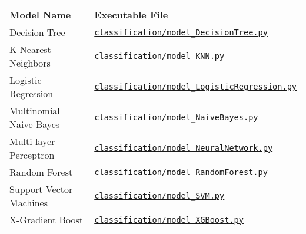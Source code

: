\documentclass[12pt]{diazessay}
\begin{document}
\begin{table}[!htbp] \centering 
	\caption{ Model \& file containing corresponding \texttt{hyperparameter\_values} definition.}
	\label{tab:hyperparameters}
\begin{longtable}[]{@{}ll@{}}
	\toprule
	Model Name & Executable File \\
	\midrule
	\endhead
	Decision Tree &
	\href{https://github.com/recursion-ninja/CSCI-795-ML/blob/main/classification/model_DecisionTree.py}{\texttt{classification/model\_DecisionTree.py}
	} \\
	K Nearest Neighbors &
	\href{https://github.com/recursion-ninja/CSCI-795-ML/blob/main/classification/model_KNN.py}{\texttt{classification/model\_KNN.py}
	} \\
	Logistic Regression &
	\href{https://github.com/recursion-ninja/CSCI-795-ML/blob/main/classification/model_LogisticRegression.py}{\texttt{classification/model\_LogisticRegression.py}} \\
	Multinomial Naive Bayes &
	\href{https://github.com/recursion-ninja/CSCI-795-ML/blob/main/classification/model_NaiveBayes.py}{\texttt{classification/model\_NaiveBayes.py}
	} \\
	Multi-layer Perceptron &
	\href{https://github.com/recursion-ninja/CSCI-795-ML/blob/main/classification/model_NeuralNetwork.py}{\texttt{classification/model\_NeuralNetwork.py}
	} \\
	Random Forest &
	\href{https://github.com/recursion-ninja/CSCI-795-ML/blob/main/classification/model_RandomForest.py}{\texttt{classification/model\_RandomForest.py}
	} \\
	Support Vector Machines &
	\href{https://github.com/recursion-ninja/CSCI-795-ML/blob/main/classification/model_SVM.py}{\texttt{classification/model\_SVM.py}
	} \\
	X-Gradient Boost &
	\href{https://github.com/recursion-ninja/CSCI-795-ML/blob/main/classification/model_XGBoost.py}{\texttt{classification/model\_XGBoost.py}
	} \\
	\bottomrule
\end{longtable}
\end{table}
\end{document}
